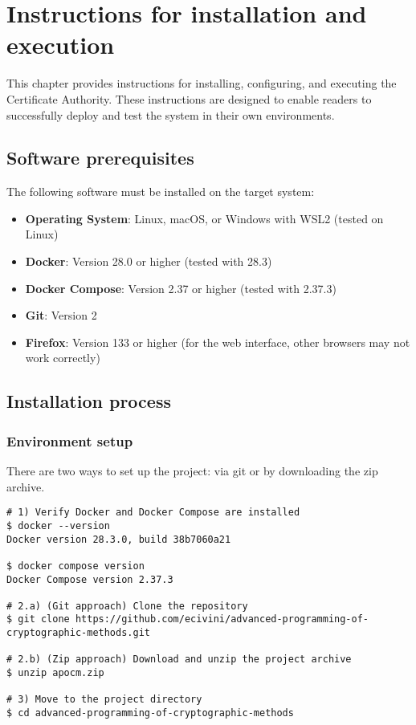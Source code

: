 \chapter{Instructions for installation and execution}

This chapter provides instructions for installing, configuring, and executing the 
Certificate Authority. These instructions are designed to enable readers to successfully 
deploy and test the system in their own environments.

\section{Software prerequisites}

The following software must be installed on the target system:
\begin{itemize}
    \item \textbf{Operating System}: Linux, macOS, or Windows with WSL2 (tested on Linux)
    \item \textbf{Docker}: Version 28.0 or higher (tested with 28.3)
    \item \textbf{Docker Compose}: Version 2.37 or higher (tested with 2.37.3)
    \item \textbf{Git}: Version 2
    \item \textbf{Firefox}: Version 133 or higher (for the web interface, other browsers may not work correctly)
\end{itemize}

\section{Installation process}

\subsection{Environment setup}
There are two ways to set up the project: via git or by downloading the zip archive. 
\begin{verbatim}
# 1) Verify Docker and Docker Compose are installed
$ docker --version
Docker version 28.3.0, build 38b7060a21

$ docker compose version
Docker Compose version 2.37.3

# 2.a) (Git approach) Clone the repository 
$ git clone https://github.com/ecivini/advanced-programming-of-cryptographic-methods.git

# 2.b) (Zip approach) Download and unzip the project archive
$ unzip apocm.zip

# 3) Move to the project directory
$ cd advanced-programming-of-cryptographic-methods
\end{verbatim}

